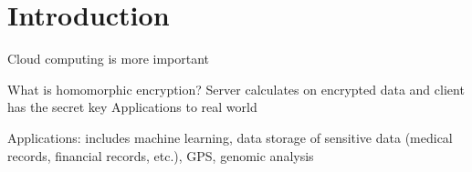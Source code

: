 \chapter{Introduction}

Cloud computing is more important

What is homomorphic encryption?
Server calculates on encrypted data and client has the secret key
Applications to real world

Applications: includes machine learning, data storage of sensitive data (medical records, financial records, etc.), GPS, genomic analysis 
